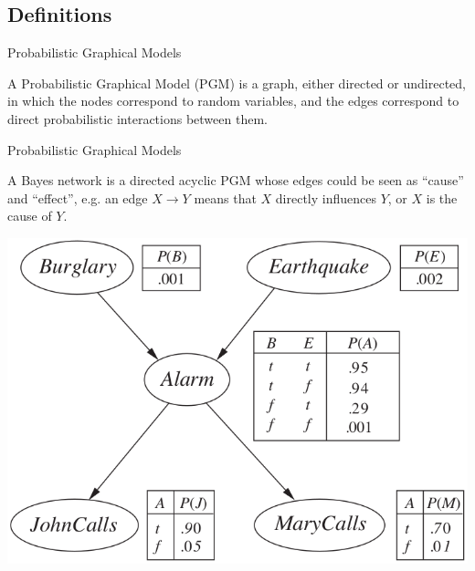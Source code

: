 \documentclass[handout]{beamer}
\begin{document}
\subsection{Definitions}
\begin{frame}{Probabilistic Graphical Models}
    \pause
    \begin{definition}
        A Probabilistic Graphical Model (PGM) is a graph, either directed or undirected, in which the nodes correspond to random variables,
        and the edges correspond to direct probabilistic interactions between them.
    \end{definition}
\end{frame}
\begin{frame}{Probabilistic Graphical Models}
    \pause
    \begin{definition}
        A Bayes network is a directed acyclic PGM whose edges could be seen as ``cause'' and ``effect'', e.g. an
        edge $ X \rightarrow Y $ means that $ X $ directly influences $ Y $, or $ X $ is the cause of $ Y $.
    \end{definition}
    \pause
    \begin{center}
        \includegraphics[scale=0.25]{bayesnet}
    \end{center}
\end{frame}
\end{document}
